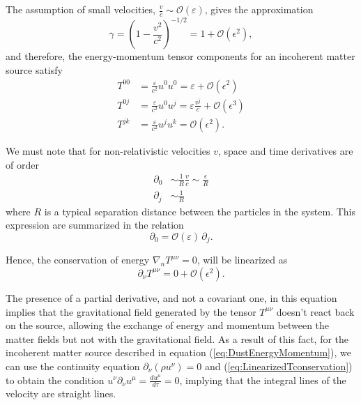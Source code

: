 The assumption of small velocities, $\frac{v}{c} \sim \mathcal{O} (\varepsilon) $, gives the approximation
\begin{equation}
\gamma = \left( 1- \frac{v^2}{c^2} \right)^{-1/2} = 1 + \mathcal{O}(\epsilon^2 ),\label{eq:gammaApproximation}
\end{equation}
and therefore, the energy-momentum tensor components for an incoherent matter source satisfy 
\begin{subequations}\label{eq:ApproximationT01}
\begin{align}
T^{00} &= \frac{\varepsilon}{c^2} u^0 u^0 = \varepsilon + \mathcal{O}(\epsilon^2 ) \\
T^{0j} &= \frac{\varepsilon}{c^2}  u^0 u^j = \varepsilon \frac{v^j}{c} + \mathcal{O}(\epsilon^3 ) \\
T^{jk} &= \frac{\varepsilon}{c^2}  u^j u^k = \mathcal{O}(\epsilon^2 ).
\end{align}
\end{subequations}

We must note that for non-relativistic velocities $v$, space and time derivatives are of order
\begin{align}
\partial_0 &\sim  \frac{1}{R} \frac{v}{c} \sim \frac{\epsilon}{R} \\
\partial_j &\sim  \frac{1}{R}
\end{align}
where $R$ is a typical separation distance between the particles in the system. This expression are summarized in the relation
\begin{equation}
\partial_0 = \mathcal{O}(\varepsilon ) \, \partial_j . \label{eq:PartialDerivativesOrder}
\end{equation}

Hence, the conservation of energy $\nabla_n T^{\mu \nu} =0$, will be linearized as
\begin{equation}
\partial_\nu T^{\mu \nu} = 0 + \mathcal{O} (\epsilon^2 ). \label{eq:LinearizedTconservation}
\end{equation}

The presence of a partial derivative, and not a covariant one, in this equation implies that the gravitational field generated by the tensor $T^{\mu \nu}$ doesn't react back on the source, allowing the exchange of energy and momentum between the matter fields but not with the gravitational field. As a result of this fact, for the incoherent matter source described in equation (\ref{eq:DustEnergyMomentum}), we can use the continuity equation $\partial_\nu \left( \rho u^\nu \right) =0$ and (\ref{eq:LinearizedTconservation}) to obtain the condition $u^\nu \partial_\nu u^\mu = \frac{du^\mu}{d\tau} = 0$, implying that the integral lines of the velocity are straight lines.


